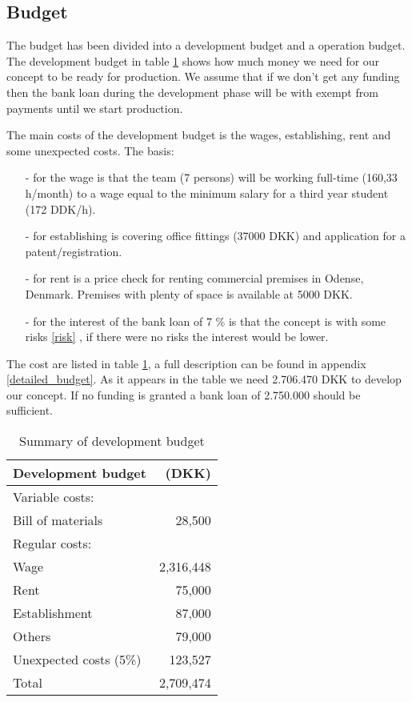 \subsection{Budget}
\label{budget_label}
The budget has been divided into a development budget and a operation budget. 
The development budget in table \ref{devbud} shows how much money we need for our concept to be ready for production. 
We assume that if we don't get any funding then the bank loan during the development phase will be with exempt from payments until we start production. 

The main costs of the development budget is the wages, establishing, rent and some unexpected costs. 
The basis: \begin{itemize}
\item[-] for the wage is that the team (7 persons) will be working full-time (160,33 h/month) to a wage equal to the minimum salary for a third year student (172 DDK/h\cite{ida-salary}).
\item[-] for establishing is covering office fittings (37000 DKK) and application for a patent/registration.
\item[-] for rent is a price check for renting commercial premises in Odense, Denmark. Premises with plenty of space is available at 5000 DKK.\cite{rent_prices}
\item[-] for the interest of the bank loan of 7 \% is that the concept is with some risks \ref{risk} , if there were no risks the interest would be lower. 
\end{itemize} 
The cost are listed in table \ref{devbud}, a full description can be found in appendix \ref{detailed_budget}. As it appears in the table we need 2.706.470 DKK to develop our concept. If no funding is granted a bank loan of 2.750.000 should be sufficient.

\begin{table}[h!]
\centering
\begin{tabular}{l r}
Development budget      & (DKK)              \\
\hline                                       
Variable costs:         &                    \\
Bill of materials       &    28,500        \\
Regular costs:          &                           \\
Wage                    &    2,316,448           \\
Rent                    &    75,000        \\
Establishment           &    87,000        \\
Others                  &    79,000        \\
Unexpected costs (5\%)  &    123,527         \\
\hline                      
Total                   &    2,709,474           \\
\end{tabular}
\caption{Summary of development budget}
\label{devbud}
\end{table}

